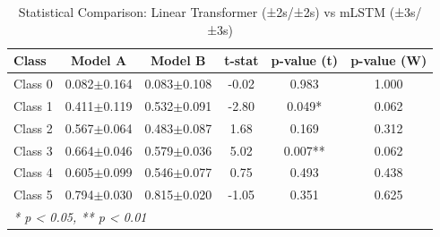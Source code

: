 \begin{table}[htbp]
\centering
\caption{Statistical Comparison: Linear Transformer (±2s/±2s) vs mLSTM (±3s/±3s)}
\label{tab:comparison_class_linear_transformer_±2s_±2s_vs_mlstm_±3s_±3s}
\begin{tabular}{lccccc}
\toprule
\textbf{Class} & \textbf{Model A} & \textbf{Model B} & \textbf{t-stat} & \textbf{p-value (t)} & \textbf{p-value (W)} \\
\midrule
Class 0 & 0.082$\pm$0.164 & 0.083$\pm$0.108 & -0.02 & 0.983 & 1.000 \\
Class 1 & 0.411$\pm$0.119 & 0.532$\pm$0.091 & -2.80 & 0.049* & 0.062 \\
Class 2 & 0.567$\pm$0.064 & 0.483$\pm$0.087 & 1.68 & 0.169 & 0.312 \\
Class 3 & 0.664$\pm$0.046 & 0.579$\pm$0.036 & 5.02 & 0.007** & 0.062 \\
Class 4 & 0.605$\pm$0.099 & 0.546$\pm$0.077 & 0.75 & 0.493 & 0.438 \\
Class 5 & 0.794$\pm$0.030 & 0.815$\pm$0.020 & -1.05 & 0.351 & 0.625 \\
\bottomrule
\multicolumn{6}{l}{\textit{* p < 0.05, ** p < 0.01}} \\
\end{tabular}
\end{table}